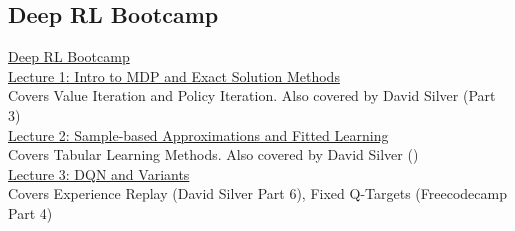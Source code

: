 \subsection{Deep RL Bootcamp}
\href{https://sites.google.com/view/deep-rl-bootcamp/lectures}{Deep RL Bootcamp}\\
\href{https://www.youtube.com/watch?v=qaMdN6LS9rA}{Lecture 1: Intro to MDP and Exact Solution Methods}\\
Covers Value Iteration and Policy Iteration. Also covered by David Silver (Part 3)\\
\href{https://www.youtube.com/watch?v=qaMdN6LS9rA}{Lecture 2: Sample-based Approximations and Fitted Learning}\\
Covers Tabular Learning Methods. Also covered by David Silver ()\\
\href{https://www.youtube.com/watch?v=qaMdN6LS9rA}{Lecture 3: DQN and Variants}\\
Covers Experience Replay (David Silver Part 6), Fixed Q-Targets (Freecodecamp Part 4)\\
